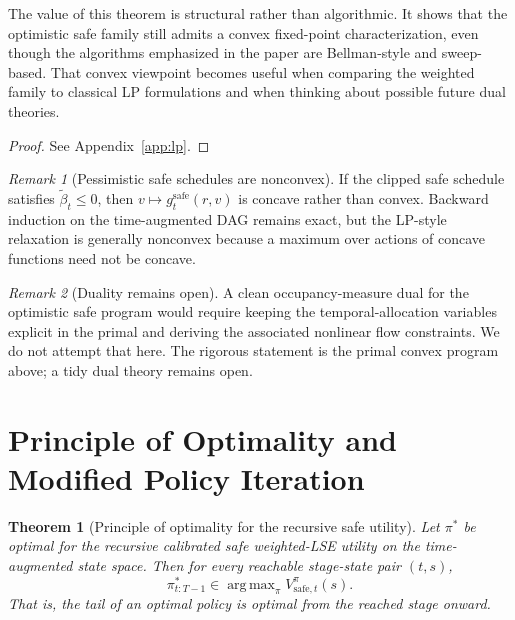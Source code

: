 \documentclass{article}
\newtheorem{theorem}{Theorem}[section]
\theoremstyle{remark}
\newtheorem{remark}[remark]{Remark}
\DeclareMathOperator*{\argmax}{arg\,max}
\newcommand{\safe}{\mathrm{safe}}
\begin{document}
The value of this theorem is structural rather than algorithmic.
It shows that the optimistic safe family still admits a convex fixed-point characterization, even though the algorithms emphasized in the paper are Bellman-style and sweep-based.
That convex viewpoint becomes useful when comparing the weighted family to classical LP formulations and when thinking about possible future dual theories.

\begin{proof}
See Appendix~\ref{app:lp}.
\end{proof}

\begin{remark}[Pessimistic safe schedules are nonconvex]
\label{rem:lp-nonconvex}
If the clipped safe schedule satisfies $\widetilde\beta_t\le 0$, then $v\mapsto g_t^{\safe}(r,v)$ is concave rather than convex.
Backward induction on the time-augmented DAG remains exact, but the LP-style relaxation is generally nonconvex because a maximum over actions of concave functions need not be concave.
\end{remark}

\begin{remark}[Duality remains open]
\label{rem:dual-open}
A clean occupancy-measure dual for the optimistic safe program would require keeping the temporal-allocation variables explicit in the primal and deriving the associated nonlinear flow constraints.
We do not attempt that here.
The rigorous statement is the primal convex program above; a tidy dual theory remains open.
\end{remark}

\section{Principle of Optimality and Modified Policy Iteration}
\label{sec:principle-of-optimality}

\begin{theorem}[Principle of optimality for the recursive safe utility]
\label{thm:principle-optimality}
Let $\pi^*$ be optimal for the recursive calibrated safe weighted-LSE utility on the time-augmented state space.
Then for every reachable stage-state pair $(t,s)$,
\begin{equation}
\pi^*_{t:T-1}\in \argmax_{\pi}V_{\safe,t}^{\pi}(s).
\label{eq:safe-principle-optimality}
\end{equation}
That is, the tail of an optimal policy is optimal from the reached stage onward.
\end{theorem}
\end{document}
